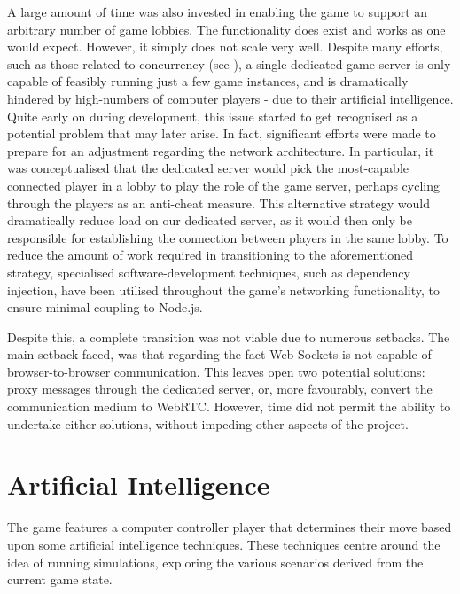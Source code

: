 \documentclass{standalone}
\begin{document}
		A large amount of time was also invested in enabling the game to support an arbitrary number of game lobbies. The functionality does exist and works as one would expect. However, it simply does not scale very well. Despite many efforts, such as those related to concurrency (see ), a single dedicated game server is only capable of feasibly running just a few game instances, and is dramatically hindered by high-numbers of computer players - due to their artificial intelligence. Quite early on during development, this issue started to get recognised as a potential problem that may later arise. In fact, significant efforts were made to prepare for an adjustment regarding the network architecture. In particular, it was conceptualised that the dedicated server would pick the most-capable connected player in a lobby to play the role of the game server, perhaps cycling through the players as an anti-cheat measure. This alternative strategy would dramatically reduce load on our dedicated server, as it would then only be responsible for establishing the connection between players in the same lobby. To reduce the amount of work required in transitioning to the aforementioned strategy, specialised software-development techniques, such as dependency injection, have been utilised throughout the game's networking functionality, to ensure minimal coupling to Node.js.

		Despite this, a complete transition was not viable due to numerous setbacks. The main setback faced, was that regarding the fact Web-Sockets is not capable of browser-to-browser communication. This leaves open two potential solutions: proxy messages through the dedicated server, or, more favourably, convert the communication medium to WebRTC. However, time did not permit the ability to undertake either solutions, without impeding other aspects of the project.

	\section{Artificial Intelligence}
		The game features a computer controller player that determines their move based upon some artificial intelligence techniques. These techniques centre around the idea of running simulations, exploring the various scenarios derived from the current game state.
\end{document}
